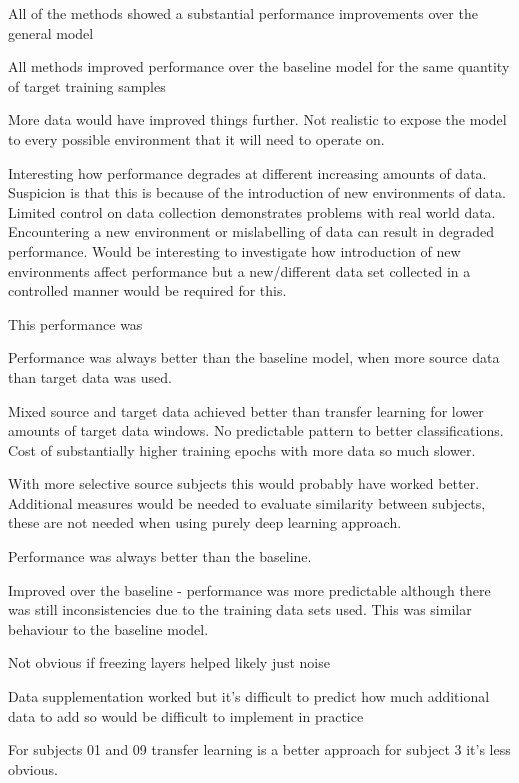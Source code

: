 All of the methods showed a substantial performance improvements over the general model

All methods improved performance over the baseline model for the same quantity of target training samples

More data would have improved things further. Not realistic to expose the model to every possible environment that it will need to operate on.

Interesting how performance degrades at different increasing amounts of data. Suspicion is that this is because of the introduction of new environments of data. Limited control on data collection demonstrates problems with real world data. Encountering a new environment or mislabelling of data can result in degraded performance. Would be interesting to investigate how introduction of new environments affect performance but a new/different data set collected in a controlled manner would be required for this.

This performance was 

Performance was always better than the baseline model, when more source data than target data was used.

Mixed source and target data achieved better than transfer learning for lower amounts of target data windows. No predictable pattern to better classifications. Cost of substantially higher training epochs with more data so much slower.

With more selective source subjects this would probably have worked better. Additional measures would be needed to evaluate similarity between subjects, these are not needed when using purely deep learning approach.

Performance was always better than the baseline.

Improved over the baseline - performance was more predictable although there was still inconsistencies due to the training data sets used. This was similar behaviour to the baseline model.

Not obvious if freezing layers helped likely just noise


Data supplementation worked but it's difficult to predict how much additional data to add so would be difficult to implement in practice

For subjects 01 and 09 transfer learning is a better approach for subject 3 it's less obvious.


